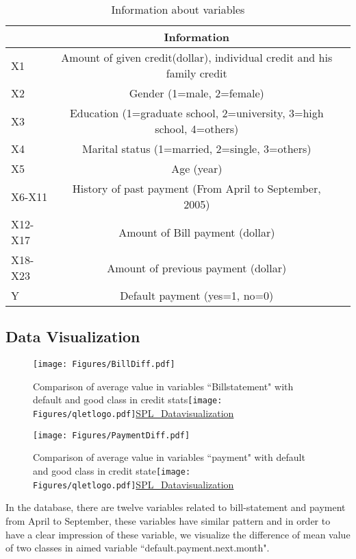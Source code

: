 \documentclass[a4paper,11pt]{article}
\begin{document}
\begin{table}[ht]
	\begin{center}
		{\footnotesize
			\begin{tabular}{l|cc}
				\hline \hline
				& Information & \\
				\hline
				X1  & Amount of given credit(dollar), individual credit and his family credit  \\
				X2 & Gender (1=male, 2=female)  \\
				X3   &  Education (1=graduate school, 2=university, 3=high school, 4=others) \\
				X4    & Marital status (1=married, 2=single, 3=others)  \\
				X5   &  Age (year) \\
				X6-X11   & History of past payment (From April to September, 2005)  \\
				X12-X17   & Amount of Bill payment (dollar)\\
				X18-X23   & Amount of previous payment (dollar)  \\
				Y   &  Default payment (yes=1, no=0) \\
				\hline \hline
		\end{tabular}}
	\end{center}
	\caption{Information about variables}
\end{table}

\subsection{Data Visualization}
 \begin{figure}[!ht] 
	\centering\texttt{[image: Figures/BillDiff.pdf]} 
	\caption{Comparison of average value in variables ``Billstatement" with default and good class in credit stats\protect\texttt{[image: Figures/qletlogo.pdf]}\href{https://github.com/Jingmin24/R-programming/tree/master/SPL_DataVisualization}{SPL\_Datavisualization}}\label{fig:diffbill} 
	\centering\texttt{[image: Figures/PaymentDiff.pdf]} 
	\caption{Comparison of average value in variables ``payment" with default and good class in credit state\protect\texttt{[image: Figures/qletlogo.pdf]}\href{https://github.com/Jingmin24/R-programming/tree/master/SPL_DataVisualization}{SPL\_Datavisualization}}\label{fig:diffpay} 
\end{figure}
In the database, there are twelve variables related to bill-statement and payment from April to September, these variables have similar pattern and in order to have a clear impression of these variable, we visualize the difference of mean value of two classes in aimed variable ``default.payment.next.month".
\end{document}

